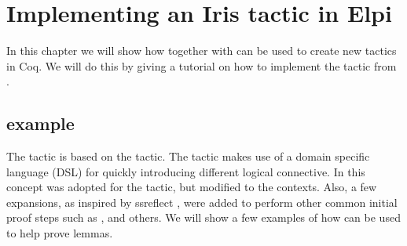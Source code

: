 \documentclass[thesis.tex]{subfiles}
\begin{document}
\chapter{Implementing an Iris tactic in Elpi}
In this chapter we will show how \elpi together with \ce can be used to create new tactics in Coq. We will do this by giving a tutorial on how to implement the  tactic from \iris.


\section[iIntros example]{ example}
The tactic  is based on the \coq {} tactic. The \coq {} tactic makes use of a domain specific language (DSL) for quickly introducing different logical connective. In \iris this concept was adopted for the  tactic, but modified to the \iris contexts. Also, a few expansions, as inspired by ssreflect \cite*{huetCoqProofAssistant1997, gonthierSmallScaleReflection2016}, were added to perform other common initial proof steps such as ,  and others. We will show a few examples of how  can be used to help prove lemmas.
\end{document}
